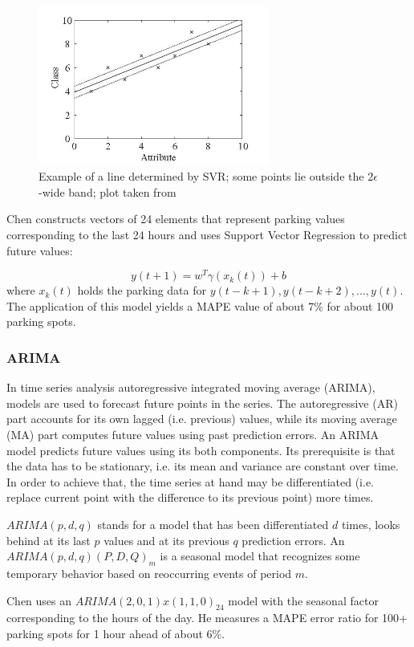 \documentclass{article}
\begin{document}
\begin{figure}[!ht]
    \centering
    \includegraphics[width=3.0in]{svr}
    \caption{Example of a line determined by SVR; some points lie outside the $2\epsilon$-wide band; plot taken from \cite{Witten} }
    \label{fig:svr}
\end{figure}

\vspace{2mm}
Chen\cite{Chen} constructs vectors of 24 elements that represent parking values corresponding to the last 24 hours and uses Support Vector Regression to predict future values:

$$y(t+1) = w^T\gamma(x_k(t)) + b$$
where $x_k(t)$ holds the parking data for $y(t-k+1), y(t-k+2), ..., y(t)$. The application of this model yields a MAPE value of about 7\% for about 100 parking spots.

\subsubsection{ARIMA}
In time series analysis autoregressive integrated moving average (ARIMA), models are used to forecast future points in the series. The autoregressive (AR) part accounts for its own lagged (i.e. previous) values, while its moving average (MA) part computes future values using past prediction errors. An ARIMA model predicts future values using its both components. Its prerequisite is that the data has to be stationary, i.e. its mean and variance are constant over time. In order to achieve that, the time series at hand may be differentiated (i.e. replace current point with the difference to its previous point) more times.

$ARIMA(p,d,q)$ stands for a model that has been differentiated $d$ times, looks behind at its last $p$ values and at its previous $q$ prediction errors. An $ARIMA(p,d,q)(P,D,Q)_m$ is a seasonal model that recognizes some temporary behavior based on reoccurring events of period $m$.

\vspace{2mm}
Chen\cite{Chen} uses an $ARIMA(2,0,1) x (1,1,0)_{24}$ model with the seasonal factor corresponding to the hours of the day. He measures a MAPE error ratio for 100+ parking spots for 1 hour ahead of about 6\%.
\end{document}

